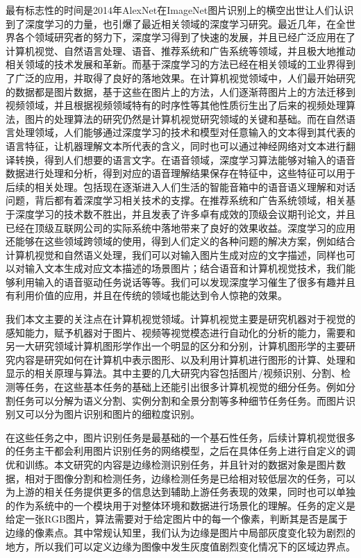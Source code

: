 \documentclass[master]{thesis-uestc}
\begin{document}
最有标志性的时间是2014年AlexNet在ImageNet图片识别上的横空出世让人们认识到了深度学习的力量，也引爆了最近相关领域的深度学习研究。最近几年，在全世界各个领域研究者的努力下，深度学习得到了快速的发展，并且已经广泛应用在了计算机视觉、自然语言处理、语音、推荐系统和广告系统等领域，并且极大地推动相关领域的技术发展和革新。而基于深度学习的方法已经在相关领域的工业界得到了广泛的应用，并取得了良好的落地效果。在计算机视觉领域中，人们最开始研究的数据都是图片数据，基于这些在图片上的方法，人们逐渐蒋图片上的方法迁移到视频领域，并且根据视频领域特有的时序性等其他性质衍生出了后来的视频处理算法，图片的处理算法的研究仍然是计算机视觉研究领域的关键和基础。而在自然语言处理领域，人们能够通过深度学习的技术和模型对任意输入的文本得到其代表的语言特征，让机器理解文本所代表的含义，同时也可以通过神经网络对文本进行翻译转换，得到人们想要的语言文字。在语音领域，深度学习算法能够对输入的语音数据进行处理和分析，得到对应的语音理解结果保存在特征中，这些特征可以用于后续的相关处理。包括现在逐渐进入人们生活的智能音箱中的语音语义理解和对话问题，背后都有着深度学习相关技术的支撑。在推荐系统和广告系统领域，相关基于深度学习的技术数不胜出，并且发表了许多卓有成效的顶级会议期刊论文，并且已经在顶级互联网公司的实际系统中落地带来了良好的效果收益。深度学习的应用还能够在这些领域跨领域的使用，得到人们定义的各种问题的解决方案，例如结合计算机视觉和自然语义处理，我们可以对输入图片生成对应的文字描述，同样也可以对输入文本生成对应文本描述的场景图片；结合语音和计算机视觉技术，我们能够利用输入的语音驱动任务说话等等。我们可以发现深度学习催生了很多有趣并且有利用价值的应用，并且在传统的领域也能达到令人惊艳的效果。

我们本文主要的关注点在计算机视觉领域。计算机视觉主要是研究机器对于视觉的感知能力，赋予机器对于图片、视频等视觉模态进行自动化的分析的能力，需要和另一大研究领域计算机图形学作出一个明显的区分和分别，计算机图形学的主要研究内容是研究如何在计算机中表示图形、以及利用计算机进行图形的计算、处理和显示的相关原理与算法。其中主要的几大研究内容包括图片/视频识别、分割、检测等任务，在这些基本任务的基础上还能引出很多计算机视觉的细分任务。例如分割任务可以分解为语义分割、实例分割和全景分割等多种细节任务任务。而图片识别又可以分为图片识别和图片的细粒度识别。

在这些任务之中，图片识别任务是最基础的一个基石性任务，后续计算机视觉很多的任务主干都会利用图片识别任务的网络模型，之后在具体任务上进行自定义的调优和训练。本文研究的内容是边缘检测识别任务，并且针对的数据对象是图片数据，相对于图像分割和检测任务，边缘检测任务是已给相对较低层次的任务，可以为上游的相关任务提供更多的信息达到辅助上游任务表现的效果，同时也可以单独的作为系统中的一个模块用于对整体环境和数据进行场景化的理解。任务的定义是给定一张RGB图片，算法需要对于给定图片中的每一个像素，判断其是否是属于边缘的像素点。其中常规认知里，我们认为边缘是图片中局部灰度变化较为剧烈的地方，所以我们可以定义边缘为图像中发生灰度值剧烈变化情况下的区域边界点。
\end{document}
